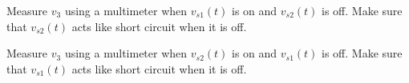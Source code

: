 \documentclass[11pt]{article}
\begin{document}
\begin{question}
    \begin{subquestion}{Measure $v_3$ using a multimeter when $v_{s1}(t)$ is on and $v_{s2}(t)$ is off. Make sure that $v_{s2}(t)$ acts like short circuit when it is off.}
    \end{subquestion}

    \begin{subquestion}{Measure $v_3$ using a multimeter when $v_{s2}(t)$ is on and $v_{s1}(t)$ is off. Make sure that $v_{s1}(t)$ acts like short circuit when it is off.}
    \end{subquestion}


\end{question}
\end{document}

